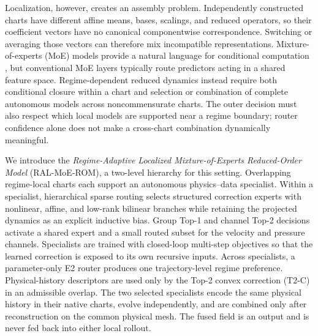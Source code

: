 Localization, however, creates an assembly problem. Independently constructed charts
have different affine means, bases, scalings, and reduced operators, so their coefficient
vectors have no canonical componentwise correspondence. Switching or averaging those
vectors can therefore mix incompatible representations. Mixture-of-experts (MoE) models
provide a natural language for conditional computation
\citep{jacobs1991,jordan1994,shazeer2017,fedus2022}, but conventional MoE layers typically
route predictors acting in a shared feature space. Regime-dependent reduced dynamics
instead require both conditional closure within a chart and selection or combination of
complete autonomous models across noncommensurate charts. The outer decision must also
respect which local models are supported near a regime boundary; router confidence alone
does not make a cross-chart combination dynamically meaningful.

We introduce the \emph{Regime-Adaptive Localized Mixture-of-Experts Reduced-Order Model}
(RAL-MoE-ROM), a two-level hierarchy for this setting. Overlapping regime-local charts
each support an autonomous physics--data specialist. Within a specialist, hierarchical
sparse routing selects structured correction experts with nonlinear, affine, and
low-rank bilinear branches while retaining the projected dynamics as an explicit
inductive bias. Group Top-1 and channel Top-2 decisions activate a shared expert and a
small routed subset for the velocity and pressure channels. Specialists are trained with
closed-loop multi-step objectives so that the learned correction is exposed to its own
recursive inputs. Across specialists, a parameter-only E2 router produces one
trajectory-level regime preference. Physical-history descriptors are used only by the
Top-2 convex correction (T2-C) in an admissible overlap. The two selected specialists
encode the same physical history in their native charts, evolve independently, and are
combined only after reconstruction on the common physical mesh. The fused field is an
output and is never fed back into either local rollout.

